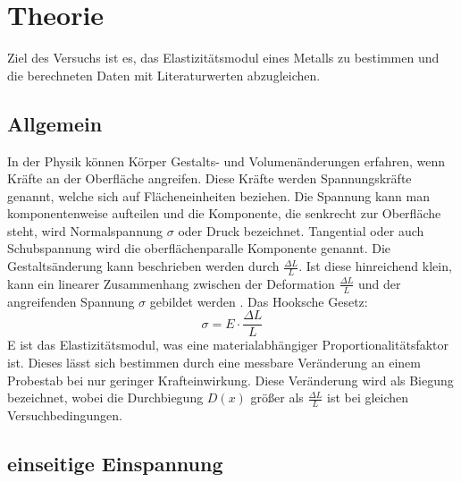 \section{Theorie}
\label{sec:Theorie}

Ziel des Versuchs ist es, das Elastizitätsmodul eines Metalls zu bestimmen und die berechneten Daten mit Literaturwerten abzugleichen.


\subsection{Allgemein}
In der Physik können Körper Gestalts- und Volumenänderungen erfahren, wenn Kräfte an der Oberfläche angreifen. Diese Kräfte werden Spannungskräfte genannt, welche sich auf Flächeneinheiten beziehen.
Die Spannung kann man komponentenweise aufteilen und die Komponente, die senkrecht zur Oberfläche steht, wird Normalspannung $\sigma$ oder Druck bezeichnet.
Tangential oder auch Schubspannung wird die oberflächenparalle Komponente genannt.
Die Gestaltsänderung kann beschrieben werden durch $\frac{\Delta L}{L}$. 
Ist diese hinreichend klein, kann ein linearer Zusammenhang zwischen der Deformation $\frac{\Delta L}{L}$ und der angreifenden Spannung $\sigma$ gebildet werden \cite[106]{V103}.  Das Hooksche Gesetz:
\begin{equation}
  \sigma = E \cdot \frac{\Delta L}{L}
  \label{eqn:Hook}
\end{equation}
E ist das Elastizitätsmodul, was eine materialabhängiger Proportionalitätsfaktor ist.
Dieses lässt sich bestimmen durch eine messbare Veränderung an einem Probestab bei nur geringer Krafteinwirkung. 
Diese Veränderung wird als Biegung bezeichnet, wobei die Durchbiegung $D(x)$ größer als $\frac{\Delta L}{L}$ ist bei gleichen Versuchbedingungen.


\subsection{einseitige Einspannung}

